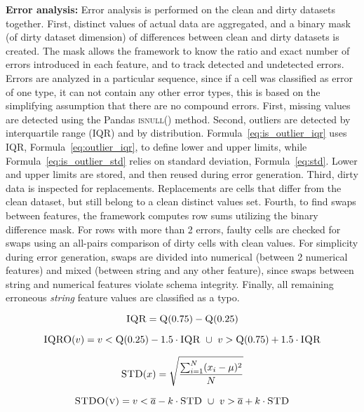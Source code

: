\textbf{Error analysis:} 
Error analysis is performed on the clean and dirty datasets together.
First, distinct values of actual data are aggregated, and a binary mask (of dirty dataset dimension) of differences between clean and dirty datasets is created.
The mask allows the framework to know the ratio and exact number of errors introduced in each feature, and to track detected and undetected errors. 
Errors are analyzed in a particular sequence, since if a cell was classified as error of one type, it can not contain any other error types, this is based on the simplifying assumption that there are no compound errors.
First, missing values are detected using the Pandas \textsc{isnull()} method. 
Second, outliers are detected by interquartile range (IQR) and by distribution. 
Formula~\ref{eq:is_outlier_iqr} uses IQR, Formula~\ref{eq:outlier_iqr}, to define lower and upper limits, while Formula~\ref{eq:is_outlier_std} relies on standard deviation, Formula~\ref{eq:std}. 
Lower and upper limits are stored, and then reused during error generation. 
Third, dirty data is inspected for replacements. 
Replacements are cells that differ from the clean dataset, but still belong to a clean distinct values set.
Fourth, to find swaps between features, the framework computes row sums utilizing the binary difference mask. 
For rows with more than 2 errors, faulty cells are checked for swaps using an all-pairs comparison of dirty cells with clean values. 
For simplicity during error generation, swaps are divided into numerical (between 2 numerical features) and mixed (between string and any other feature), since swaps between string and numerical features violate schema integrity.
Finally, all remaining erroneous \emph{string} feature values are classified as a typo.

\begin{equation}
\label{eq:outlier_iqr}
\textsc{IQR} = \textsc{Q}(0.75) - \textsc{Q}(0.25)  
\end{equation}

\begin{equation}
\label{eq:is_outlier_iqr}
\textsc{IQRO}(v) =  v < \textsc{Q}(0.25) - 1.5 \cdot \textsc{IQR} \ \cup \  v >  \textsc{Q}(0.75) + 1.5 \cdot \textsc{IQR}
\end{equation}

\begin{equation}
    \label{eq:std}
    \textsc{STD}(x) = \sqrt{\frac{\sum_{i=1}^{N}(x_{i}-\mu)^{2}}{N}}
\end{equation}

\begin{equation}
\label{eq:is_outlier_std}
\textsc{STDO(v)} = v < \overline{a} - k \cdot \textsc{STD} \ \cup \ v > \overline{a} + k \cdot \textsc{STD} 
\end{equation}

